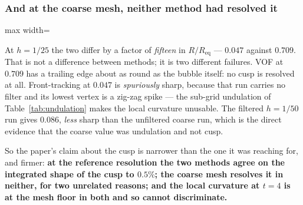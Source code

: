 \subsubsection{And at the coarse mesh, neither method had resolved it}

\begin{table}[htbp]
\centering
\caption{The same two numbers at both resolutions, $t=4$.}
\label{tab:cuspres}
\small
\begin{adjustbox}{max width=\linewidth}
\end{adjustbox}
\end{table}

At $h=1/25$ the two differ by a factor of \emph{fifteen} in $R/R_{\mathrm{eq}}$
--- $0.047$ against $0.709$. That is not a difference between methods; it is two
different failures. VOF at $0.709$ has a trailing edge about as round as the
bubble itself: no cusp is resolved at all. Front-tracking at $0.047$ is
\emph{spuriously} sharp, because that run carries no filter and its lowest
vertex is a zig-zag spike --- the sub-grid undulation of
Table~\ref{tab:undulation} makes the local curvature unusable. The filtered
$h=1/50$ run gives $0.086$, \emph{less} sharp than the unfiltered coarse run,
which is the direct evidence that the coarse value was undulation and not cusp.

So the paper's claim about the cusp is narrower than the one it was reaching
for, and firmer: \textbf{at the reference resolution the two methods agree on
the integrated shape of the cusp to $0.5\%$; the coarse mesh resolves it in
neither, for two unrelated reasons; and the local curvature at $t=4$ is at the
mesh floor in both and so cannot discriminate.}


